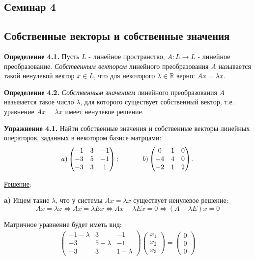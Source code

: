\documentclass[a4paper, 12pt]{article}
\begin{document}
\begin{spacing}{1.5}
\setlength{\parindent}{0ex}

\section*{Семинар 4}


\subsection*{Собственные векторы и собственные значения}

\textbf{Определение 4.1.} 
Пусть $L $ - линейное пространство, $A: L \rightarrow L$ - линейное преобразование. \textit{Собственным вектором} линейного преобразования $A$ называется такой ненулевой вектор $x\in L$, что для некоторого $\lambda \in \mathbb{R}$ верно: $Ax = \lambda x$.

\textbf{Определение 4.2.} \textit{Собственным значением} линейного преобразования $A$ называется такое число $\lambda$, для которого существует собственный вектор, т.е. уравнение $Ax= \lambda x$ имеет ненулевое решение.

\textbf{Упражнение 4.1.} Найти собственные значения и собственные векторы линейных операторов, заданных в некотором базисе матрцами:
\begin{align*}
a) 
\begin{pmatrix}
-1 & 3 & -1 \\
-3 & 5 & -1 \\
-3 & 3 & 1
\end{pmatrix}; \hspace{12mm}
b) 
\begin{pmatrix}
0 & 1 & 0 \\
-4 & 4 & 0 \\
-2 & 1 & 2
\end{pmatrix}.
\end{align*}

\underline{Решение}:

\setlength{\leftskip}{5ex}
\setlength{\rightskip}{5ex}

\textbf{a)} Ищем такие $\lambda$, что у системы $Ax = \lambda x$ существует ненулевое решение:
$$Ax= \lambda x \Leftrightarrow Ax = \lambda Ex \Leftrightarrow Ax - \lambda Ex = 0 \Leftrightarrow (A - \lambda E)x = 0$$

Матричное уравнение будет иметь вид:
\begin{align*}
\begin{pmatrix}
    -1 - \lambda & 3 & -1 \\
    -3 & 5 - \lambda & -1 \\
    -3 & 3 & 1 - \lambda
\end{pmatrix}
\begin{pmatrix}
    x_1 \\
    x_2 \\
    x_3
\end{pmatrix}
=
\begin{pmatrix}
    0 \\
    0 \\
    0
\end{pmatrix}
\end{align*}


\end{spacing}
\end{document}
